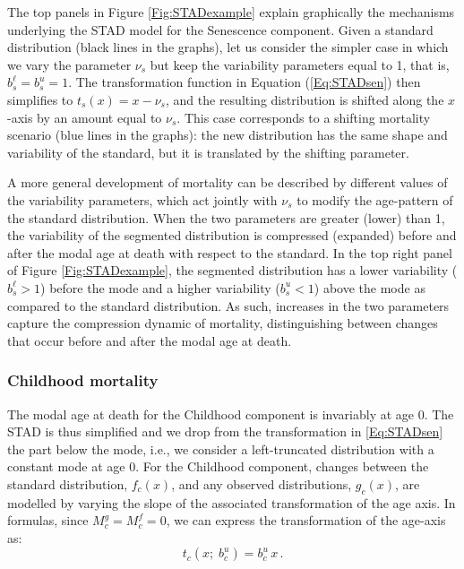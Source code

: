 \documentclass[11pt, a4paper]{article}
\begin{document}
The top panels in Figure \ref{Fig:STADexample} explain graphically the mechanisms underlying the STAD model for the Senescence component. Given a standard distribution (black lines in the graphs), let us consider the simpler case in which we vary the parameter $\nu_{s}$ but keep the {\color{red}variability} parameters equal to 1, that is, $b_{s}^{\ell} = b_{s}^{u} = 1$. The transformation function in Equation (\ref{Eq:STADsen}) then simplifies to $t_{s}(x) = x - \nu_{s}$, and the resulting distribution is shifted along the $x$-axis by an amount equal to $\nu_{s}$. This case corresponds to a shifting mortality scenario (blue lines in the graphs): the new distribution has the same shape and variability of the standard, but it is  translated by the shifting parameter.

A more general development of mortality can be described by different values of the {\color{red}variability} parameters, which act jointly with $\nu_{s}$ to modify the age-pattern of the standard distribution. When the two parameters are greater (lower) than 1, the variability of the segmented distribution is {\color{red}compressed} (expanded) before and after the modal age at death with respect to the standard. In the top right panel of Figure \ref{Fig:STADexample}, the segmented distribution has a lower variability ($b_{s}^{\ell} > 1$) before the mode and a higher variability ($b_{s}^{u} < 1$) above the mode as compared to the standard distribution. As such, {\color{red}increases in} the two parameters capture the compression dynamic of mortality, distinguishing between changes that occur before and after the modal age at death.

\subsubsection{Childhood mortality}

The modal age at death for the Childhood component is invariably at age 0. The STAD is thus simplified and we drop from the transformation in \eqref{Eq:STADsen} the part below the mode, i.e., we consider a left-truncated distribution with a constant mode at age 0. For the Childhood component, changes between the standard distribution, $f_{c}(x)$, and any observed distributions, $g_{c}(x)$, are modelled by varying the slope of the associated transformation of the age axis. In formulas, since $M_{c}^{g} = M_{c}^{f} = 0$, we can express the transformation of the age-axis as:
\begin{equation}\label{Eq:STADchil}
t_{c}(x;\;b_{c}^{u}) =  b_{c}^{u} \, x \,.
\end{equation}
\end{document}
